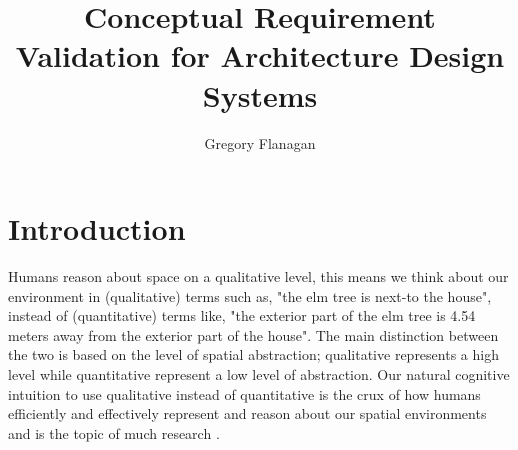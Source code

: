 \documentclass[12pt]{ucthesis}
\begin{document}

\title{Conceptual Requirement Validation for Architecture Design Systems}
\author{Gregory Flanagan}
  
 
     



\maketitle

\begin{frontmatter}

\copyrightpage

\committeemembershippage

\begin{abstract}
 



\end{abstract}





\tableofcontents


\listoftables

\listoffigures

\end{frontmatter}

\pagestyle{plain}




\renewcommand{\baselinestretch}{1.66}







\chapter{Introduction}
\label{intro}
Humans reason about space on a qualitative level, this means we think about our environment in (qualitative) terms such as, "the elm tree is next-to the house", instead of (quantitative) terms like, "the exterior part of the elm tree is 4.54 meters away from the exterior part of the house". The main distinction between the two is based on the level of spatial abstraction; qualitative represents a high level while quantitative represent a low level of abstraction. Our natural cognitive intuition to use qualitative instead of quantitative is the crux of how humans efficiently and effectively represent and reason about our spatial environments and is the topic of much research \cite{freksa1991qsr} \cite{Cohn:2001:QSR}.
\end{document}
